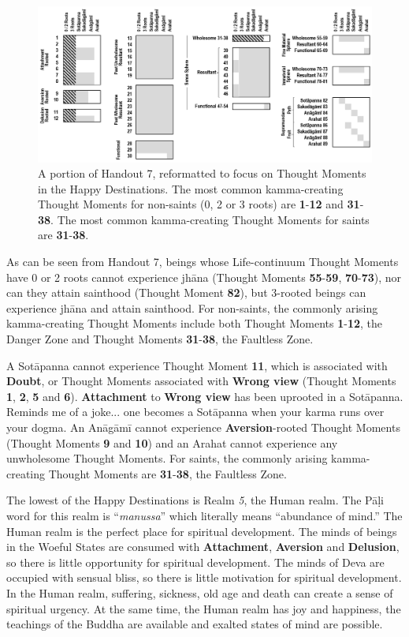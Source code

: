 \begin{figure}[h]
\centering
\includegraphics[width=1\linewidth]{./Diagrams/Happy}
\caption{A portion of Handout 7, reformatted to focus on Thought Moments in the Happy Destinations. The most common kamma-creating Thought Moments for non-saints (0, 2 or 3 roots) are \textbf{1}-\textbf{12} and \textbf{31}-\textbf{38}. The most common kamma-creating Thought Moments for saints are \textbf{31}-\textbf{38}.}
\label{fig:Happy}
\end{figure}

As can be seen from Handout 7, beings whose Life-continuum Thought Moments have 0 or 2 roots cannot experience jhāna (Thought Moments \textbf{55}-\textbf{59}, \textbf{70}-\textbf{73}), nor can they attain sainthood (Thought Moment \textbf{82}), but 3-rooted beings can experience jhāna and attain sainthood. For non-saints, the commonly arising kamma-creating Thought Moments include both Thought Moments \textbf{1}-\textbf{12}, the Danger Zone and Thought Moments \textbf{31}-\textbf{38}, the Faultless Zone.

A Sotāpanna cannot experience Thought Moment \textbf{11}, which is associated with \textbf{Doubt}, or Thought Moments associated with \textbf{Wrong view} (Thought Moments \textbf{1}, \textbf{2}, \textbf{5} and \textbf{6}). \textbf{Attachment} to \textbf{Wrong view} has been uprooted in a Sotāpanna. Reminds me of a joke... one becomes a Sotāpanna when your karma runs over your dogma. An Anāgāmī cannot experience \textbf{Aversion}-rooted Thought Moments (Thought Moments \textbf{9} and \textbf{10}) and an Arahat cannot experience any unwholesome Thought Moments. For saints, the commonly arising kamma-creating Thought Moments are \textbf{31}-\textbf{38}, the Faultless Zone.

The lowest of the Happy Destinations is Realm \textit{5}, the Human realm. The Pāḷi word for this realm is “\textit{manussa}” which literally means “abundance of mind.” The Human realm is the perfect place for spiritual development. The minds of beings in the Woeful States are consumed with \textbf{Attachment}, \textbf{Aversion} and \textbf{Delusion}, so there is little opportunity for spiritual development. The minds of Deva are occupied with sensual bliss, so there is little motivation for spiritual development. In the Human realm, suffering, sickness, old age and death can create a sense of spiritual urgency. At the same time, the Human realm has joy and happiness, the teachings of the Buddha are available and exalted states of mind are possible.

